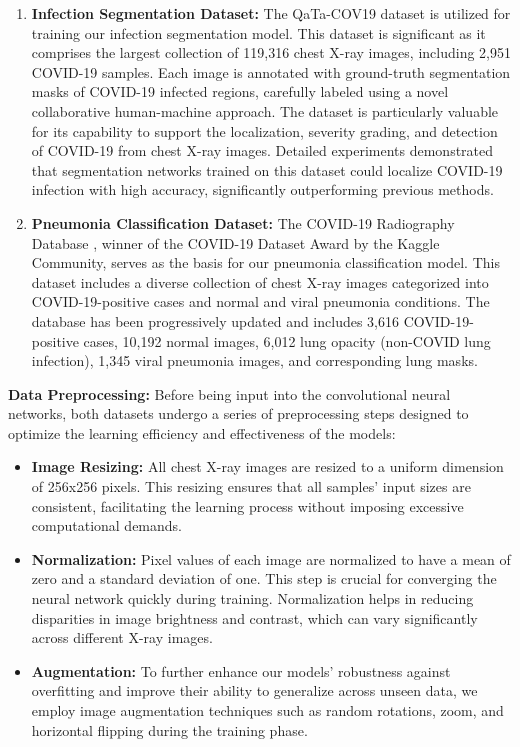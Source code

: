 \documentclass[10pt]{article}
\begin{document}
\begin{enumerate}
    \item \textbf{Infection Segmentation Dataset:} The QaTa-COV19 dataset \cite{Degerli2021} is utilized for training our infection segmentation model. This dataset is significant as it comprises the largest collection of 119,316 chest X-ray images, including 2,951 COVID-19 samples. Each image is annotated with ground-truth segmentation masks of COVID-19 infected regions, carefully labeled using a novel collaborative human-machine approach. The dataset is particularly valuable for its capability to support the localization, severity grading, and detection of COVID-19 from chest X-ray images. Detailed experiments demonstrated that segmentation networks trained on this dataset could localize COVID-19 infection with high accuracy, significantly outperforming previous methods.

    \item \textbf{Pneumonia Classification Dataset:} The COVID-19 Radiography Database \cite{Chowdhury2020}, winner of the COVID-19 Dataset Award by the Kaggle Community, serves as the basis for our pneumonia classification model. This dataset includes a diverse collection of chest X-ray images categorized into COVID-19-positive cases and normal and viral pneumonia conditions. The database has been progressively updated and includes 3,616 COVID-19-positive cases, 10,192 normal images, 6,012 lung opacity (non-COVID lung infection), 1,345 viral pneumonia images, and corresponding lung masks.
\end{enumerate}

\textbf{Data Preprocessing:}
Before being input into the convolutional neural networks, both datasets undergo a series of preprocessing steps designed to optimize the learning efficiency and effectiveness of the models:

\begin{itemize}
    \item \textbf{Image Resizing:} All chest X-ray images are resized to a uniform dimension of 256x256 pixels. This resizing ensures that all samples' input sizes are consistent, facilitating the learning process without imposing excessive computational demands.
    \item \textbf{Normalization:} Pixel values of each image are normalized to have a mean of zero and a standard deviation of one. This step is crucial for converging the neural network quickly during training. Normalization helps in reducing disparities in image brightness and contrast, which can vary significantly across different X-ray images.
    \item \textbf{Augmentation:} To further enhance our models' robustness against overfitting and improve their ability to generalize across unseen data, we employ image augmentation techniques such as random rotations, zoom, and horizontal flipping during the training phase.
\end{itemize}
\end{document}
